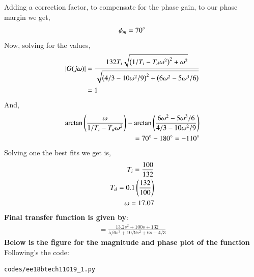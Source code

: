 \begin{enumerate}[label=\thesection.\arabic*.,ref=\thesection.\theenumi]
Adding a correction factor, to compensate for the phase gain,  to our phase margin we get, 
\begin{align}
    \phi_{m} = 70\degree
\end{align}
Now, solving for the values,\newline
\begin{align}
    \left\vert G(j\omega)\right\vert &= \frac{132 T_i\sqrt{\left(1/T_i-T_d\omega ^{2}\right)^2 + \omega ^2}}{\sqrt{\left(4/3-10\omega ^2/9\right)^2 + \left(6 \omega ^2 -5\omega ^3/6\right)}}\\
    &= 1
\end{align}
And,\newline
\begin{align}
    \arctan\left(\frac{\omega}{1/T_i-T_d\omega ^{2}}\right) - \arctan\left(\frac{6 \omega ^2 -5\omega ^3/6}{4/3-10\omega ^2/9}\right)\\
    = 70\degree-180\degree = -110\degree       
\end{align}
Solving one the best fits we get is,\newline
\begin{align}
    T_i = \frac{100}{132}\\
    T_d = 0.1\left(\frac{132}{100}\right)\\
    \omega = 17.07
\end{align}
\textbf{Final transfer function is given by}:
\begin{align}
 = \frac{13.2s^2+100s+132}{5/6s^3 + 10/9s^2 + 6s + 4/3}
\end{align}
\textbf{Below is the figure for the magnitude and phase plot of the function}\newline
Following's the code:
\begin{lstlisting}
codes/ee18btech11019_1.py
\end{lstlisting}


\end{enumerate}
